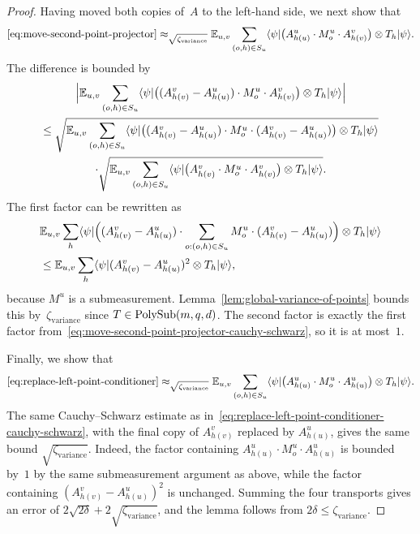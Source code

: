 \begin{proof}
  Having moved both copies of~$A$ to the left-hand side, we next show that
  \begin{equation}\label{eq:replace-left-point-conditioner}
    \eqref{eq:move-second-point-projector}
    \approx_{\sqrt{\zeta_{\mathrm{variance}}}}
    \mathbb{E}_{u,v} \sum_{(o, h) \in S_{u}} \langle \psi \rvert \bigl(A^{u}_{h(u)} \cdot M^{u}_o \cdot A^{v}_{h(v)}\bigr) \otimes T_h  \lvert \psi \rangle.
  \end{equation}
  The difference is bounded by
  \begin{multline}\label{eq:replace-left-point-conditioner-cauchy-schwarz}
    \Big|\mathbb{E}_{u,v} \sum_{(o, h) \in S_{u}} \langle \psi \rvert \bigl((A^{v}_{h(v)} - A^{u}_{h(u)}) \cdot M^{u}_o \cdot A^{v}_{h(v)}\bigr) \otimes T_h  \lvert \psi \rangle\Big|\\
    \leq
    \sqrt{\mathbb{E}_{u,v} \sum_{(o, h) \in S_{u}} \langle \psi \rvert \bigl((A^{v}_{h(v)} - A^{u}_{h(u)}) \cdot M^{u}_o \cdot (A^{v}_{h(v)} - A^{u}_{h(u)})\bigr) \otimes T_h  \lvert \psi \rangle}\\
    \cdot \sqrt{\mathbb{E}_{u,v} \sum_{(o, h) \in S_{u}} \langle \psi \rvert \bigl(A^{v}_{h(v)} \cdot M^{u}_o \cdot A^{v}_{h(v)}\bigr) \otimes T_h  \lvert \psi \rangle}.
  \end{multline}
  The first factor can be rewritten as
  \begin{align*}
    &\mathbb{E}_{u,v} \sum_h \langle \psi \rvert
      \Bigl((A^v_{h(v)} - A^u_{h(u)}) \cdot
      \sum_{o:(o,h)\in S_u} M^u_o \cdot
      (A^v_{h(v)} - A^u_{h(u)})\Bigr) \otimes T_h \lvert \psi \rangle \\
    &\le \mathbb{E}_{u,v} \sum_h \langle \psi \rvert
      (A^v_{h(v)} - A^u_{h(u)})^2 \otimes T_h \lvert \psi \rangle,
  \end{align*}
  because $M^u$ is a submeasurement. Lemma~\ref{lem:global-variance-of-points}
  bounds this by~$\zeta_{\mathrm{variance}}$ since $T \in \mathrm{PolySub}(m,q,d)$. The
  second factor is exactly the first factor
  from~\eqref{eq:move-second-point-projector-cauchy-schwarz},
  so it is at most~$1$.

  Finally, we show that
  \begin{equation}\label{eq:replace-right-point-conditioner}
    \eqref{eq:replace-left-point-conditioner}
    \approx_{\sqrt{\zeta_{\mathrm{variance}}}}
    \mathbb{E}_{u,v} \sum_{(o, h) \in S_{u}} \langle \psi \rvert \bigl(A^{u}_{h(u)} \cdot M^{u}_o \cdot A^{u}_{h(u)}\bigr) \otimes T_h  \lvert \psi \rangle.
  \end{equation}
  The same Cauchy--Schwarz estimate
  as in~\eqref{eq:replace-left-point-conditioner-cauchy-schwarz}, with
  the final copy of $A^v_{h(v)}$ replaced by $A^u_{h(u)}$, gives the same bound
  $\sqrt{\zeta_{\mathrm{variance}}}$. Indeed, the factor containing
  $A^u_{h(u)} \cdot M^u_o \cdot A^u_{h(u)}$ is bounded by~$1$ by the same
  submeasurement argument as above, while the factor containing
  $(A^v_{h(v)} - A^u_{h(u)})^2$ is unchanged. Summing the four transports gives an
  error of $2\sqrt{2\delta} + 2\sqrt{\zeta_{\mathrm{variance}}}$, and the lemma
  follows from $2\delta \leq \zeta_{\mathrm{variance}}$.
\end{proof}

